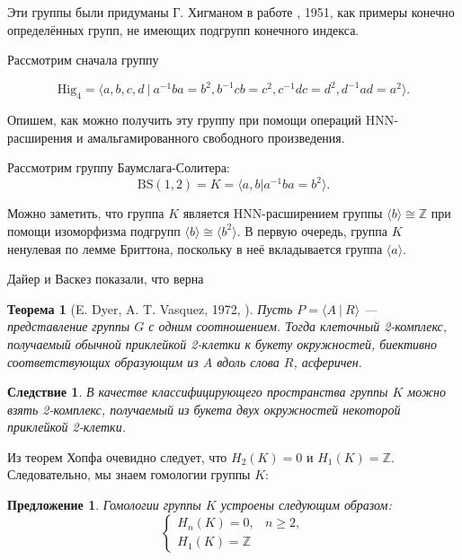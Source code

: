 \documentclass[14pt, dvipsnames]{extarticle}
\newtheorem{theorem}{Теорема}
\newtheorem{proposition}{Предложение}
\newtheorem{corollary}{Следствие}[theorem]
\theoremstyle{definition}
\theoremstyle{remark}
\begin{document}
Эти группы были придуманы Г. Хигманом в работе \cite{Higman}, 1951, как примеры конечно определённых групп, не имеющих подгрупп конечного индекса.

Рассмотрим сначала группу

$$\mathrm{Hig}_4=\langle a, b, c, d\ |\ a^{-1}ba=b^2, b^{-1}cb=c^2, c^{-1}dc=d^2, d^{-1}ad=a^2 \rangle.$$ 

Опишем, как можно получить эту группу при помощи операций HNN-расширения и амальгамированного свободного произведения.

Рассмотрим группу Баумслага-Солитера: $$\mathrm{BS}(1,2)=K=\langle a, b | a^{-1}ba=b^2 \rangle.$$

Можно заметить, что группа $K$ является HNN-расширением группы $\langle b \rangle\cong\mathbb{Z}$ при помощи изоморфизма подгрупп $\langle b \rangle \cong \langle b^2 \rangle$. В первую очередь, группа $K$ ненулевая по лемме Бриттона, поскольку в неё вкладывается группа $\langle a \rangle$. 


Дайер и Васкез показали, что верна

\begin{theorem}[E. Dyer, A. T. Vasquez, 1972, \cite{Vasquez}]

Пусть $P=\langle A\ |\ R \rangle$ --- представление группы $G$ с одним соотношением. Тогда клеточный 2-комплекс, получаемый обычной приклейкой 2-клетки к букету окружностей, биективно соответствующих образующим из $A$ вдоль слова $R$, асферичен.

\end{theorem}



\begin{corollary}
В качестве классифицирующего пространства группы $K$ можно взять 2-комплекс, получаемый из букета двух окружностей некоторой приклейкой 2-клетки. 
\end{corollary}

Из теорем Хопфа очевидно следует, что $H_2(K)=0$ и $H_1(K)=\mathbb{Z}$. Следовательно, мы знаем гомологии группы $K$:

\begin{proposition}
Гомологии группы $K$ устроены следующим образом: $$\begin{cases}
H_{n}(K)=0, & n\geqslant2,\\
H_{1}(K)=\mathbb{Z}
\end{cases}$$
\end{proposition}
\end{document}
